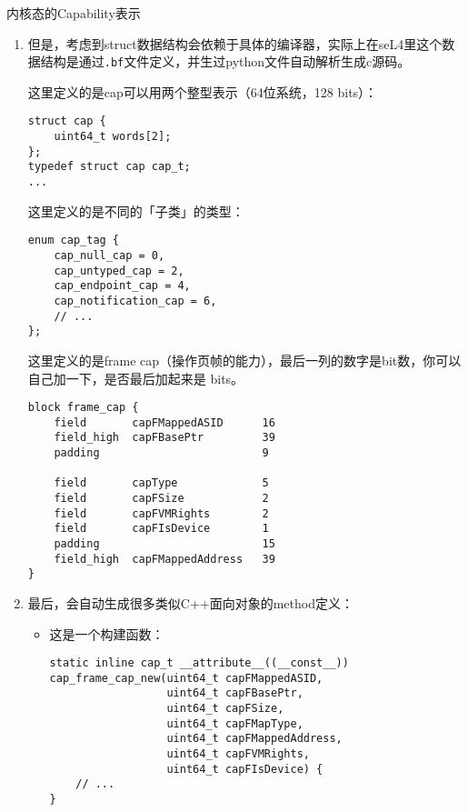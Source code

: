 \documentclass[presentation,dvipdfmx,CJKbookmarks]{beamer}
\begin{document}
\begin{CJK*}{UTF8}{simsun}
\begin{frame}[label={sec:org5b08469},fragile]{内核态的\thinspace Capability\thinspace 表示}
\begin{enumerate}
\begin{verbatim}
struct Capability {
    enum cap_tag tag; // 用于\thinspace RTTI\thinspace 的类型标签
};
\end{verbatim}

\item 但是，考虑到\thinspace struct\thinspace 数据结构会依赖于具体的编译器，实际上在\thinspace seL4\thinspace 里这个数据结构是通过\thinspace \texttt{.bf}\thinspace 文件定义，并生过\thinspace python\thinspace 文件自动解析生成\thinspace c\thinspace 源码。

这里定义的是\thinspace cap\thinspace 可以用两个整型表示（64\thinspace 位系统，128 bits）：
\begin{verbatim}
struct cap {
    uint64_t words[2];
};
typedef struct cap cap_t;
...
\end{verbatim}

这里定义的是不同的「子类」的类型：
\begin{verbatim}
enum cap_tag {
    cap_null_cap = 0,
    cap_untyped_cap = 2,
    cap_endpoint_cap = 4,
    cap_notification_cap = 6,
    // ...
};
\end{verbatim}

这里定义的是\thinspace frame cap（操作页帧的能力），最后一列的数字是\thinspace bit\thinspace 数，你可以自己加一下，是否最后加起来是 bits。
\begin{verbatim}
block frame_cap {
    field       capFMappedASID      16
    field_high  capFBasePtr         39
    padding                         9

    field       capType             5
    field       capFSize            2
    field       capFVMRights        2
    field       capFIsDevice        1
    padding                         15
    field_high  capFMappedAddress   39
}
\end{verbatim}

\item 最后，会自动生成很多类似\thinspace C++面向对象的\thinspace method\thinspace 定义：

\begin{itemize}
\item 这是一个构建函数：

\begin{verbatim}
static inline cap_t __attribute__((__const__))
cap_frame_cap_new(uint64_t capFMappedASID,
                  uint64_t capFBasePtr,
                  uint64_t capFSize,
                  uint64_t capFMapType,
                  uint64_t capFMappedAddress,
                  uint64_t capFVMRights,
                  uint64_t capFIsDevice) {
    // ...
}


\end{verbatim}
\end{itemize}
\end{enumerate}
\end{frame}
\end{CJK*}
\end{document}
